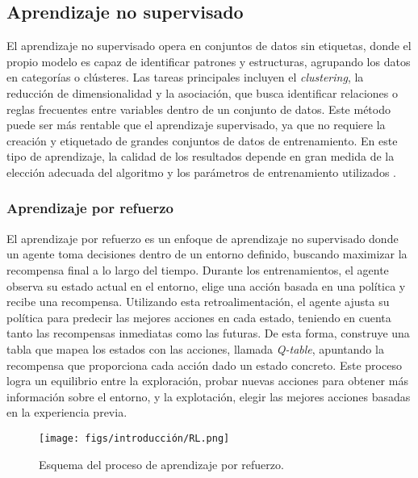 \subsection{Aprendizaje no supervisado}

El aprendizaje no supervisado opera en conjuntos de datos sin etiquetas, donde el propio modelo es capaz de identificar patrones y estructuras, agrupando los datos en categorías o clústeres. Las tareas principales incluyen el \textit{clustering}, la reducción de dimensionalidad y la asociación, que busca identificar relaciones o reglas frecuentes entre variables dentro de un conjunto de datos. Este método puede ser más rentable que el aprendizaje supervisado, ya que no requiere la creación y etiquetado de grandes conjuntos de datos de entrenamiento. En este tipo de aprendizaje, la calidad de los resultados depende en gran medida de la elección adecuada del algoritmo y los parámetros de entrenamiento utilizados \cite{no-supervised-learning}.

\subsubsection{Aprendizaje por refuerzo}
\label{sec:refuerzo}

El aprendizaje por refuerzo es un enfoque de aprendizaje no supervisado donde un agente toma decisiones dentro de un entorno definido, buscando maximizar la recompensa final a lo largo del tiempo. Durante los entrenamientos, el agente observa su estado actual en el entorno, elige una acción basada en una política y recibe una recompensa. Utilizando esta retroalimentación, el agente ajusta su política para predecir las mejores acciones en cada estado, teniendo en cuenta tanto las recompensas inmediatas como las futuras. De esta forma, construye una tabla que mapea los estados con las acciones, llamada \textit{Q-table}, apuntando la recompensa que proporciona cada acción dado un estado concreto. Este proceso logra un equilibrio entre la exploración, probar nuevas acciones para obtener más información sobre el entorno, y la explotación, elegir las mejores acciones basadas en la experiencia previa.

\begin{figure}[ht]
\begin{center}
\texttt{[image: figs/introducción/RL.png]}
\end{center}
\caption{Esquema del proceso de aprendizaje por refuerzo.}
\label{fig:rl}
\end{figure}

